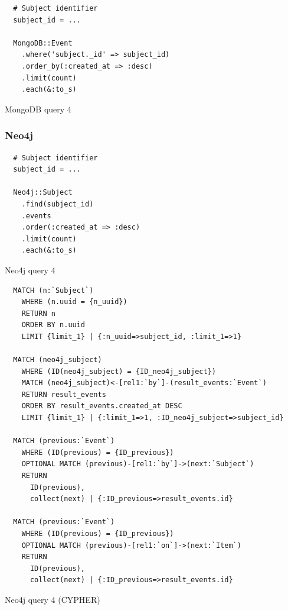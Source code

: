 \begin{listing}[H]
  \begin{verbatim}
  # Subject identifier
  subject_id = ...

  MongoDB::Event
    .where('subject._id' => subject_id)
    .order_by(:created_at => :desc)
    .limit(count)
    .each(&:to_s)
  \end{verbatim}

  \caption{MongoDB query 4}
  \label{lst:mongodb-query-4}
\end{listing}

\subsubsection*{Neo4j}

\begin{listing}[H]
  \begin{verbatim}
  # Subject identifier
  subject_id = ...

  Neo4j::Subject
    .find(subject_id)
    .events
    .order(:created_at => :desc)
    .limit(count)
    .each(&:to_s)
  \end{verbatim}

  \caption{Neo4j query 4}
  \label{lst:neo4j-query-4}
\end{listing}

\begin{listing}[H]
  \begin{verbatim}
  MATCH (n:`Subject`)
    WHERE (n.uuid = {n_uuid})
    RETURN n
    ORDER BY n.uuid
    LIMIT {limit_1} | {:n_uuid=>subject_id, :limit_1=>1}

  MATCH (neo4j_subject)
    WHERE (ID(neo4j_subject) = {ID_neo4j_subject})
    MATCH (neo4j_subject)<-[rel1:`by`]-(result_events:`Event`)
    RETURN result_events
    ORDER BY result_events.created_at DESC
    LIMIT {limit_1} | {:limit_1=>1, :ID_neo4j_subject=>subject_id}

  MATCH (previous:`Event`)
    WHERE (ID(previous) = {ID_previous})
    OPTIONAL MATCH (previous)-[rel1:`by`]->(next:`Subject`)
    RETURN
      ID(previous),
      collect(next) | {:ID_previous=>result_events.id}

  MATCH (previous:`Event`)
    WHERE (ID(previous) = {ID_previous})
    OPTIONAL MATCH (previous)-[rel1:`on`]->(next:`Item`)
    RETURN
      ID(previous),
      collect(next) | {:ID_previous=>result_events.id}
  \end{verbatim}

  \caption{Neo4j query 4 (CYPHER)}
  \label{lst:neo4j-query-4}
\end{listing}

